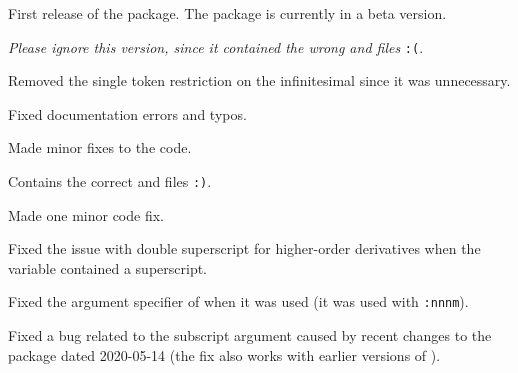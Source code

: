 \printindex[macro]
	
	\clearpage

\setlength{\marginparwidth}{75pt}

\begin{changelog}
	\begin{change}[version=0.9,  date=2019-07-21, beta=true]
		\item First release of the package. The package is currently in a beta version.
	\end{change}
	\bigskip
	\begin{change}[version=0.95, date=2019-09-18, beta=true]
		\item \emph{Please ignore this version, since it contained the wrong  and  files} \texttt{:(}.
		\item Removed the single token restriction on the infinitesimal since it was unnecessary.
		\item Fixed documentation errors and typos.
		\item Made minor fixes to the code.
	\end{change}
	\begin{change}[version=0.95b, date=2019-09-21, beta=true]
		\item Contains the correct  and  files \texttt{:)}.
		\item Made one minor code fix.
	\end{change}
	\smallskip
	\begin{change}[version=0.96, date=2019-12-22, beta=true]
		\item Fixed the issue with double superscript for higher-order derivatives when the variable contained a superscript.
	\end{change}
	\smallskip
	\begin{change}[version=0.97, date=2020-02-03, beta=true]
		\item Fixed the argument specifier of  when it was used (it was used with \texttt{:nnnm}).
	\end{change}
	\smallskip
	\begin{change}[version=0.98, date=2020-07-20, beta=true]
		\item Fixed a bug related to the subscript argument caused by recent changes to the  package dated 2020-05-14 (the fix also works with earlier versions of ).
	\end{change}

\end{changelog}
